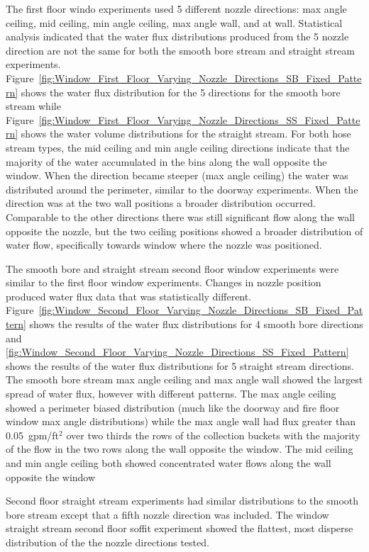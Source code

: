 \documentclass[12pt,oneside]{book}
\begin{document}
\clearpage

The first floor windo experiments used 5 different nozzle directions: max angle ceiling, mid ceiling, min angle ceiling, max angle wall, and at wall. Statistical analysis indicated that the water flux distributions produced from the 5 nozzle direction are not the same for both the smooth bore stream and straight stream experiments. Figure~\ref{fig:Window_First_Floor_Varying_Nozzle_Directions_SB_Fixed_Pattern} shows the water flux distribution for the 5 directions for the smooth bore stream while Figure~\ref{fig:Window_First_Floor_Varying_Nozzle_Directions_SS_Fixed_Pattern} shows the water volume distributions for the straight stream. For both hose stream types, the mid ceiling and min angle ceiling directions indicate that the majority of the water accumulated in the bins along the wall opposite the window. When the direction became steeper (max angle ceiling) the water was distributed around the perimeter, similar to the doorway experiments. When the direction was at the two wall positions a broader distribution occurred. Comparable to the other directions there was still significant flow along the wall opposite the nozzle, but the two ceiling positions showed a broader distribution of water flow, specifically towards window where the nozzle was positioned.

The smooth bore and straight stream second floor window experiments were similar to the first floor window experiments. Changes in nozzle position produced water flux data that was statistically different. Figure~\ref{fig:Window_Second_Floor_Varying_Nozzle_Directions_SB_Fixed_Pattern} shows the results of the water flux distributions for 4 smooth bore directions and \ref{fig:Window_Second_Floor_Varying_Nozzle_Directions_SS_Fixed_Pattern} shows the results of the water flux distributions for 5 straight stream directions. The smooth bore stream max angle ceiling and max angle wall showed the largest spread of water flux, however with different patterns. The max angle ceiling showed a perimeter biased distribution (much like the doorway and fire floor window max angle distributions) while the max angle wall had flux greater than 0.05~gpm/ft$^2$ over two thirds the rows of the collection buckets with the majority of the flow in the two rows along the wall opposite the window. The mid ceiling and min angle ceiling both showed concentrated water flows along the wall opposite the window

Second floor straight stream experiments had similar distributions to the smooth bore stream except that a fifth nozzle direction was included. The window straight stream second floor soffit experiment showed the flattest, most disperse distribution of the the nozzle directions tested.
\end{document}
